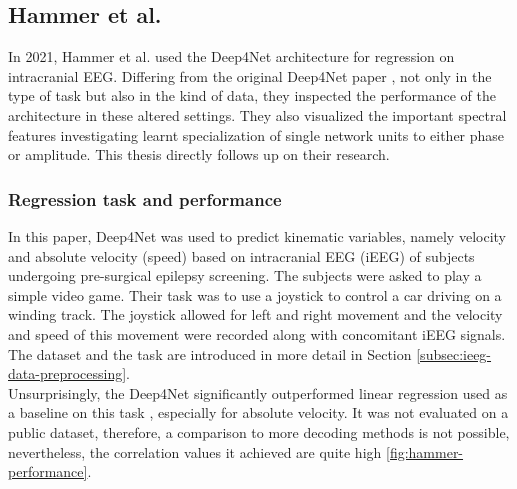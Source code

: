 \subsection{Hammer et al.}\label{subsec:hammer-et-al}
In 2021, Hammer et al. \cite{Hammer-2021} used the Deep4Net architecture for regression on intracranial EEG.
Differing from the original Deep4Net paper \cite{schirrmeister-deep-2017}, not only in the type of task but also in the kind of data, they inspected the performance of the architecture in these altered settings.
They also visualized the important spectral features investigating learnt specialization of single network units to either phase or amplitude.
This thesis directly follows up on their research.

\subsubsection{Regression task and performance}
In this paper, Deep4Net was used to predict kinematic variables, namely velocity and absolute velocity (speed) based on intracranial EEG (iEEG) of subjects undergoing pre-surgical epilepsy screening. The subjects were asked to play a simple video game. 
Their task was to use a joystick to control a car driving on a winding track. 
The joystick allowed for left and right movement and the velocity and speed of this movement were recorded along with concomitant iEEG signals. 
The dataset and the task are introduced in more detail in Section \ref{subsec:ieeg-data-preprocessing}.\\

Unsurprisingly, the Deep4Net significantly outperformed linear regression used as a baseline on this task \cite{Hammer-2021}, especially for absolute velocity.
It was not evaluated on a public dataset, therefore, a comparison to more decoding methods is not possible, nevertheless, the correlation values it achieved are quite high \ref{fig:hammer-performance}.  

